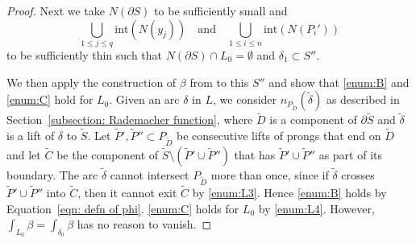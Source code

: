 \documentclass[10pt]{amsart}
\newcommand{\inte}{\mathrm{int}}
\theoremstyle{plain}
\theoremstyle{definition}
\numberwithin{equation}{subsection}
\newcommand{\bdry}{\partial}
\begin{document}
\begin{proof}
Next we take $N(\bdry S)$ to be sufficiently small and
\[
\bigcup_{1\leq j\leq q} \inte(N(y_j))\quad\text{and}\quad\bigcup_{1\leq i\leq n} \inte(N(P_i'))
\]
to be sufficiently thin such that $N(\partial S)\cap L_0 =\emptyset$ and $\delta_1 \subset S''$.

We then apply the construction of $\beta$ from \cite[Prop.\,6.3]{CH2} to this $S''$ and show that \eqref{enum:B} and \eqref{enum:C} hold for $L_0$. Given an arc $\delta$ in $L$, we consider $n_{P_{\widetilde D}}(\widetilde \delta)$ as described in Section~\ref{subsection: Rademacher function}, where $\widetilde D$ is a component of $\bdry\widetilde S$ and $\widetilde \delta$ is a lift of $\delta$ to $\widetilde S$. Let $\widetilde P', \widetilde P''\subset P_{\widetilde D}$ be consecutive lifts of prongs that end on $\widetilde D$ and let $\widetilde C$ be the component of $\widetilde S\setminus(\widetilde P'\cup \widetilde P'')$ that has $\widetilde P'\cup \widetilde P''$ as part of its boundary. The arc $\widetilde \delta$ cannot intersect $P_{\widetilde D}$ more than once, since if $\widetilde \delta$ crosses $\widetilde P'\cup \widetilde P''$ into $\widetilde C$, then it cannot exit $\widetilde C$ by \eqref{enum:L3}. Hence \eqref{enum:B} holds by Equation~\eqref{eqn: defn of phi}. \eqref{enum:C} holds for $L_0$ by \eqref{enum:L4}. However, $\int_{L_0} \beta =\int_{\delta_{0}} \beta$ has no reason to vanish.


\end{proof}
\end{document}
